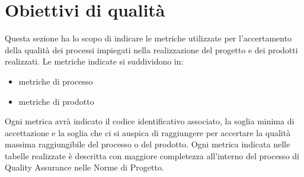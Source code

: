 \section{Obiettivi di qualità}
\label{sec:obiettivi_qualità}
Questa sezione ha lo scopo di indicare le metriche utilizzate per l'accertamento della qualità dei processi impiegati nella realizzazione
del progetto e dei prodotti realizzati.
Le metriche indicate si suddividono in:
\begin{itemize}
    \item metriche di processo
    \item metriche di prodotto
\end{itemize} 
Ogni metrica avrà indicato il codice identificativo associato, la soglia minima di accettazione e la soglia che ci si auspica di raggiungere 
per accertare la qualità massima raggiungibile del processo o del prodotto.
Ogni metrica indicata nelle tabelle realizzate è descritta con maggiore completezza all'interno del processo di Quality Assurance nelle Norme di Progetto.





